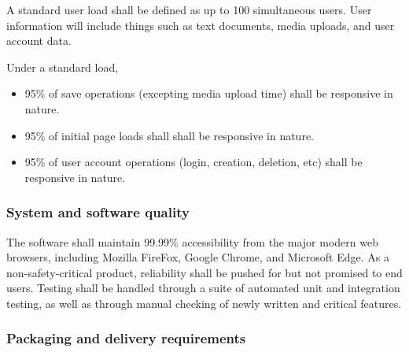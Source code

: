 \documentclass[letterpaper, 10pt, draftclsnofoot, compsoc, onecolumn]{IEEEtran}
\begin{document}
{{A standard user load shall be defined as up to 100 simultaneous users. User information
will include things such as text documents, media uploads, and user account data.

Under a standard load,
\begin{itemize}
  \item 95\% of save operations (excepting media upload time) shall be responsive in 
  nature.
  \item 95\% of initial page loads shall shall be responsive in 
  nature.
  \item 95\% of user account operations (login, creation, deletion, etc) shall be 
  responsive in nature.
\end{itemize}

\subsubsection[System and software
quality]{\rmfamily\bfseries\color{black} System
and software quality}

The software shall maintain 99.99\% accessibility from the major modern web browsers, including Mozilla FireFox, Google Chrome, and Microsoft Edge.
As a non-safety-critical product, reliability shall be pushed for but not promised
to end users. Testing shall be handled through a suite of automated unit and integration testing, as well as
through manual checking of newly written and critical features.

\subsubsection[Packaging and delivery
requirements]{\rmfamily\bfseries\color{black}
Packaging and delivery requirements}


}}
\end{document}
